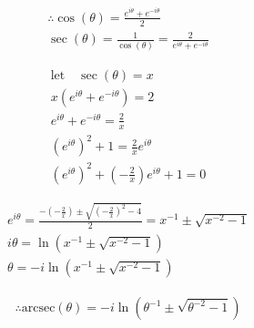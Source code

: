 \documentclass{../style}
\begin{document}
\euler

\begin{gather*}
	\therefore \cos(\theta) = \frac{e^{i\theta} + e^{-i\theta}}{2} \\
	\sec(\theta) = \frac{1}{\cos(\theta)} = \frac{2}{e^{i\theta} + e^{-i\theta}}
\end{gather*}

\begin{gather*}
	\text{let} \quad \sec(\theta) = x \\
	x(e^{i\theta} + e^{-i\theta}) = 2 \\
	e^{i\theta} + e^{-i\theta} = \frac{2}{x} \\
	(e^{i\theta})^2 + 1 = \frac{2}{x}e^{i\theta} \\
	(e^{i\theta})^2 + (-\frac{2}{x})e^{i\theta} + 1 = 0
\end{gather*}

\begin{gather*}
	e^{i\theta} = \frac{-(-\frac{2}{x}) \pm \sqrt{(-\frac{2}{x})^2 - 4}}{2} = x^{-1} \pm \sqrt{x^{-2} - 1} \\
	i\theta = \ln(x^{-1} \pm \sqrt{x^{-2} - 1}) \\
	\theta = -i\ln(x^{-1} \pm \sqrt{x^{-2} - 1})
\end{gather*}

\begin{gather*}
	\therefore \text{arcsec}(\theta) = -i\ln(\theta^{-1} \pm \sqrt{\theta^{-2} - 1})
\end{gather*}
\end{document}
